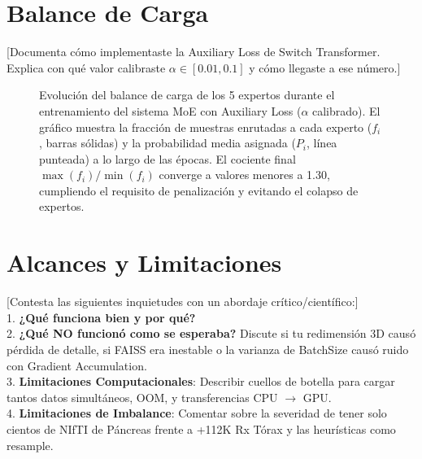 \documentclass[conference, 11pt]{IEEEtran}
\begin{document}
\section{Balance de Carga}
[Documenta cómo implementaste la Auxiliary Loss de Switch Transformer. Explica con qué valor calibraste $\alpha \in [0.01, 0.1]$ y cómo llegaste a ese número.]

\begin{figure}[H]
    \centering
    \caption{Evolución del balance de carga de los 5 expertos durante el entrenamiento del sistema MoE con Auxiliary Loss ($\alpha$ calibrado). El gráfico muestra la fracción de muestras enrutadas a cada experto ($f_i$, barras sólidas) y la probabilidad media asignada ($P_i$, línea punteada) a lo largo de las épocas. El cociente final $\max(f_i)/\min(f_i)$ converge a valores menores a 1.30, cumpliendo el requisito de penalización y evitando el colapso de expertos.}
    \label{fig:load_balance}
\end{figure}

\section{Alcances y Limitaciones}
[Contesta las siguientes inquietudes con un abordaje crítico/científico:] \\
1. \textbf{¿Qué funciona bien y por qué?} \\
2. \textbf{¿Qué NO funcionó como se esperaba?} Discute si tu redimensión 3D causó pérdida de detalle, si FAISS era inestable o la varianza de BatchSize causó ruido con Gradient Accumulation.\\
3. \textbf{Limitaciones Computacionales}: Describir cuellos de botella para cargar tantos datos simultáneos, OOM, y transferencias CPU $\rightarrow$ GPU.\\
4. \textbf{Limitaciones de Imbalance}: Comentar sobre la severidad de tener solo cientos de NIfTI de Páncreas frente a +112K Rx Tórax y las heurísticas como resample.\\
\end{document}
